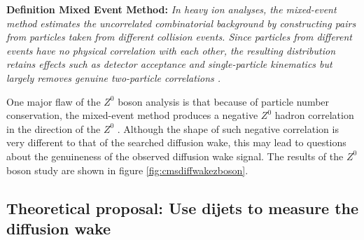 \documentclass[
  a4paper,
  12pt,
  oneside,
  parskip=half,
  listof=totoc,
  bibliography=totoc,
  DIV=12,
  numbers=noenddot,
  BA.tex
  ]{subfiles}
\begin{document}
\begin{mdframed}
	\textbf{Definition Mixed Event Method:} \textit{In heavy ion analyses, the mixed-event method estimates the uncorrelated combinatorial background by constructing pairs from particles taken from different collision events. Since particles from different events have no physical correlation with each other, the resulting distribution retains effects such as detector acceptance and single-particle kinematics but largely removes genuine two-particle correlations \cite{alice_collaboration_multiplicity_2016}.}
\end{mdframed}

One major flaw of the $Z^0$ boson analysis is that because of particle number conservation, the mixed-event method produces a negative $Z^0$ hadron correlation in the direction of the $Z^0$ \cite{yang_background-free_2025}. Although the shape of such negative correlation is very different to that of the searched diffusion wake, this may lead to questions about the genuineness of the observed diffusion wake signal. The results of the $Z^0$ boson study are shown in figure \ref{fig:cmsdiffwakezboson}.

\subsection{Theoretical proposal: Use dijets to measure the diffusion wake}
\end{document}
